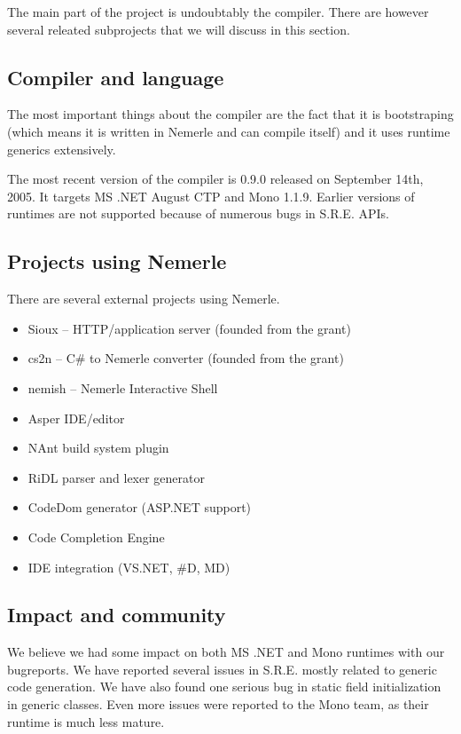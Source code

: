 \documentclass{article}
\begin{document}
The main part of the project is undoubtably the compiler.
There are however several releated subprojects that we will
discuss in this section.

\subsection{Compiler and language}

The most important things about the compiler are the
fact that it is bootstraping (which means it is written
in Nemerle and can compile itself) and it uses runtime
generics extensively.

The most recent version of the compiler is 0.9.0 released
on September 14th, 2005. It targets MS .NET August CTP
and Mono 1.1.9. Earlier versions of runtimes are not
supported because of numerous bugs in S.R.E. APIs.

\subsection{Projects using Nemerle}

There are several external projects using Nemerle.

\begin{itemize}
  \item Sioux -- HTTP/application server (founded from the grant)
  \item cs2n -- C\# to Nemerle converter (founded from the grant)
  \item nemish -- Nemerle Interactive Shell
  \item Asper IDE/editor
  \item NAnt build system plugin
  \item RiDL parser and lexer generator
  \item CodeDom generator (ASP.NET support)
  \item Code Completion Engine
  \item IDE integration (VS.NET, \#D, MD)
\end{itemize}


\subsection{Impact and community}

We believe we had some impact on both MS .NET and Mono runtimes
with our bugreports. We have reported several issues in S.R.E.
mostly related to generic code generation. We have also found one
serious bug in static field initialization in generic classes.
Even more issues were reported to the Mono team, as their
runtime is much less mature.
\end{document}
